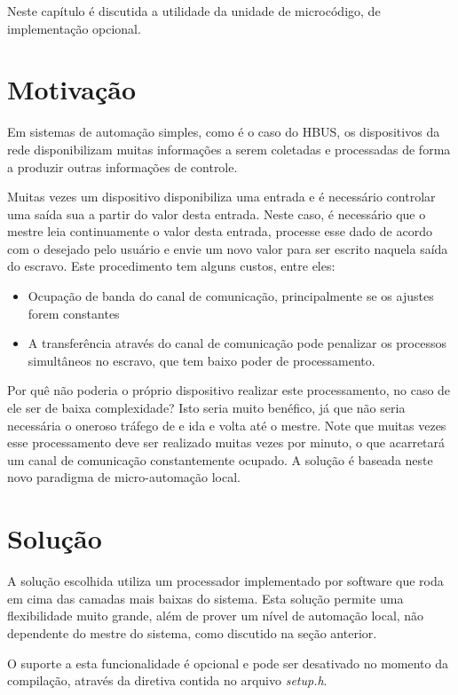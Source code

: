 Neste capítulo é discutida a utilidade da unidade de microcódigo, de implementação opcional.

\section{Motivação}

Em sistemas de automação simples, como é o caso do HBUS, os dispositivos da rede disponibilizam muitas informações a serem coletadas e processadas de forma a produzir outras informações de controle.

Muitas vezes um dispositivo disponibiliza uma entrada e é necessário controlar uma saída sua a partir do valor desta entrada. Neste caso, é necessário que o mestre leia continuamente o valor desta entrada, processe esse dado de acordo com o desejado pelo usuário e envie um novo valor para ser escrito naquela saída do escravo. Este procedimento tem alguns custos, entre eles:

\begin{itemize}
\item Ocupação de banda do canal de comunicação, principalmente se os ajustes forem constantes
\item A transferência através do canal de comunicação pode penalizar os processos simultâneos no escravo, que tem baixo poder de processamento.
\end{itemize}

Por quê não poderia o próprio dispositivo realizar este processamento, no caso de ele ser de baixa complexidade? Isto seria muito benéfico, já que não seria necessária o oneroso tráfego de e ida e volta até o mestre. Note que muitas vezes esse processamento deve ser realizado muitas vezes por minuto, o que acarretará um canal de comunicação constantemente ocupado. A solução é baseada neste novo paradigma de micro-automação local.

\section{Solução}

A solução escolhida utiliza um processador implementado por software que roda em cima das camadas mais baixas do sistema. Esta solução permite uma flexibilidade muito grande, além de prover um nível de automação local, não dependente do mestre do sistema, como discutido na seção anterior.

O suporte a esta funcionalidade é opcional e pode ser desativado no momento da compilação, através da diretiva contida no arquivo \textit{setup.h}.

